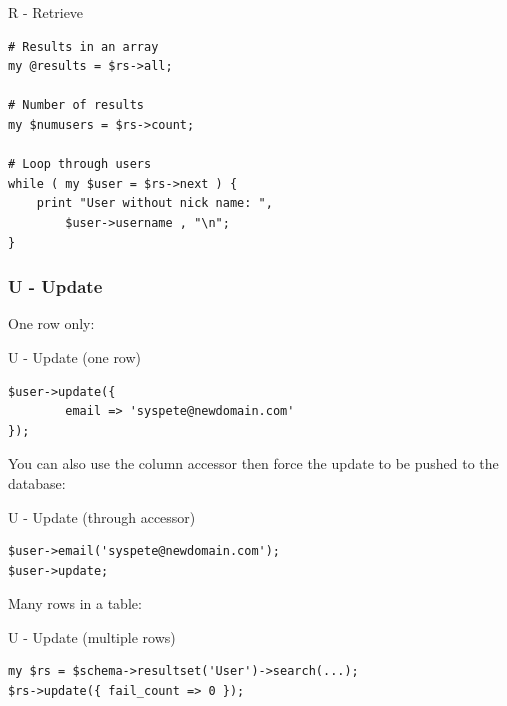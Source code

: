 \begin{frame}[fragile]{R - Retrieve}
\begin{lstlisting}
# Results in an array
my @results = $rs->all;

# Number of results
my $numusers = $rs->count;

# Loop through users
while ( my $user = $rs->next ) {
    print "User without nick name: ",
        $user->username , "\n";
}
\end{lstlisting}
\end{frame}




\subsubsection{U - Update}

One row only:

\begin{frame}[fragile]{U - Update (one row)}
\begin{lstlisting}
$user->update({
        email => 'syspete@newdomain.com'
});
\end{lstlisting}
\end{frame}

You can also use the column accessor then force the update to be pushed to
the database:

\begin{frame}[fragile]{U - Update (through accessor)}
\begin{lstlisting}
$user->email('syspete@newdomain.com');
$user->update;
\end{lstlisting}
\end{frame}

Many rows in a table:

\begin{frame}[fragile]{U - Update (multiple rows)}
\begin{lstlisting}
my $rs = $schema->resultset('User')->search(...);
$rs->update({ fail_count => 0 });
\end{lstlisting}
\end{frame}

